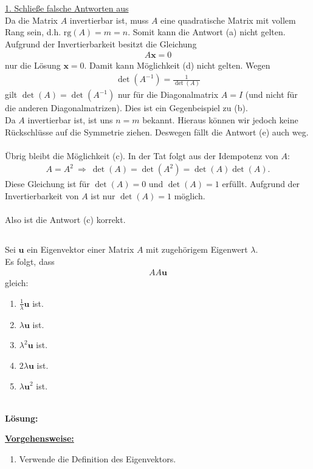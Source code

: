 \underline{1. Schließe falsche Antworten aus}\\
Da die Matrix $A$ invertierbar ist, muss $A$ eine quadratische Matrix mit vollem Rang sein, d.h. $\mathrm{rg}(A) = m= n$. Somit kann die Antwort (a) nicht gelten.
Aufgrund der Invertierbarkeit besitzt die Gleichung
\begin{align*}
	A \mathbf{x} = 0
\end{align*} 
nur die Lösung $\mathbf{x} = 0$. Damit kann Möglichkeit (d) nicht gelten.
Wegen 
\begin{align*}
	\det(A^{-1}) = \frac{1}{\det(A)}
\end{align*}
gilt $\det(A) = \det(A^{-1})$ nur für die Diagonalmatrix $A = I$ (und nicht für die anderen Diagonalmatrizen). Dies ist ein Gegenbeispiel zu (b).\\
Da $A$ invertierbar ist, ist uns $n = m$ bekannt. Hieraus können wir jedoch keine Rückschlüsse auf die Symmetrie ziehen. Deswegen fällt die Antwort (e) auch weg.\\
\\
Übrig bleibt die Möglichkeit (c). In der Tat folgt aus der Idempotenz von $A$:
\begin{align*}
	A = A^2 
	\ \Rightarrow \
	\det(A) = \det(A^2) = \det(A) \det(A).
\end{align*}
Diese Gleichung ist für $\det(A) = 0$ und $\det(A) = 1$ erfüllt.
Aufgrund der Invertierbarkeit von $A$ ist nur $\det(A) = 1$ möglich. \\
\\
Also ist die Antwort (c) korrekt.




\newpage

\subsection*{}
Sei $\mathbf{u} $ ein Eigenvektor einer Matrix $A$ mit zugehörigem Eigenwert $\lambda$.
\\
Es folgt, dass 
\begin{align*}
	AA \mathbf{u}
\end{align*}
gleich:
\renewcommand{\labelenumi}{(\alph{enumi})}
\begin{enumerate}
	\item 
	$ \frac{1}{\lambda} \mathbf{u} $ ist.
	\item 
	$ \lambda \mathbf{u} $ ist.
	\item
	$ \lambda^2 \mathbf{u}$ ist.
	\item
	$ 2\lambda \mathbf{u} $ ist.
	\item 
	$ \lambda \mathbf{u}^2 $ ist.
\end{enumerate}
\ \\
\textbf{Lösung:}
\begin{mdframed}
\underline{\textbf{Vorgehensweise:}}
\renewcommand{\labelenumi}{\theenumi.}
\begin{enumerate}
\item Verwende die Definition des Eigenvektors.
\end{enumerate}
\end{mdframed}

